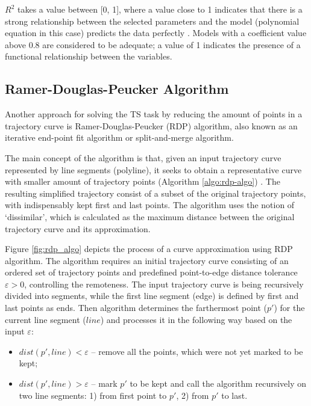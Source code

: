 $R^2$ takes a value between [0, 1], where a value close to 1 indicates that there is a strong relationship between the selected parameters and the model (polynomial equation in this case) predicts the data perfectly \cite{online:reg_r_interpr}. Models with a coefficient value above 0.8 are considered to be adequate; a value of 1 indicates the presence of a functional relationship between the variables.

\subsection{Ramer-Douglas-Peucker Algorithm}

Another approach for solving the TS task by reducing the amount of points in a trajectory curve is Ramer-Douglas-Peucker (RDP) algorithm, also known as an iterative end-point fit algorithm or split-and-merge algorithm.

The main concept of the algorithm is that, given an input trajectory curve represented by line segments (polyline), it seeks to obtain a representative curve with smaller amount of trajectory points (Algorithm \ref{algo:rdp-algo}) \cite{online:rdp_algo_wiki}. The resulting simplified trajectory consist of a subset of the original trajectory points, with indispensably kept first and last points. The algorithm uses the notion of `dissimilar', which is calculated as the maximum distance between the original trajectory curve and its approximation.

Figure \ref{fig:rdp_algo} depicts the process of a curve approximation using RDP algorithm. The algorithm requires an initial trajectory curve consisting of an ordered set of trajectory points and predefined point-to-edge distance tolerance $\varepsilon > 0$, controlling the remoteness. The input trajectory curve is being recursively divided into segments, while the first line segment (edge) is defined by first and last points as ends. Then algorithm determines the farthermost point ($p'$) for the current line segment ($line$) and processes it in the following way based on the input $\varepsilon$:

\begin{itemize}
	\setlength\itemsep{0em}
	\item $dist(p', line) < \varepsilon$ -- remove all the points, which were not yet marked to be kept;
	\item $dist(p', line) > \varepsilon$ -- mark $p'$ to be kept and call the algorithm recursively on two line segments: 1) from first point to $p'$, 2) from $p'$ to last.
\end{itemize} 

